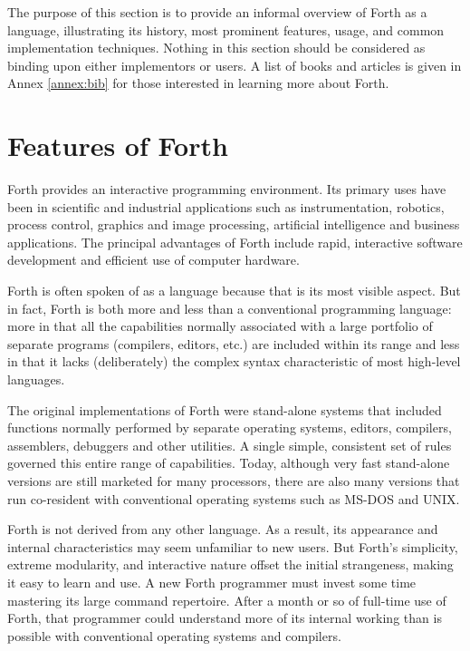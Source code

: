 \label{annex:intro}

The purpose of this section is to provide an informal overview of
Forth as a language, illustrating its history, most prominent
features, usage, and common implementation techniques. Nothing in
this section should be considered as binding upon either implementors
or users. A list of books and articles is given in Annex
\ref{annex:bib} for those interested in learning more about Forth.

\section{Features of Forth} %

Forth provides an interactive programming environment. Its primary
uses have been in scientific and industrial applications such as
instrumentation, robotics, process control, graphics and image
processing, artificial intelligence and business applications. The
principal advantages of Forth include rapid, interactive software
development and efficient use of computer hardware.

Forth is often spoken of as a language because that is its most
visible aspect. But in fact, Forth is both more and less than a
conventional programming language: more in that all the capabilities
normally associated with a large portfolio of separate programs
(compilers, editors, etc.) are included within its range and less in
that it lacks (deliberately) the complex syntax characteristic of
most high-level languages.

The original implementations of Forth were stand-alone systems that
included functions normally performed by separate operating systems,
editors, compilers, assemblers, debuggers and other utilities. A
single simple, consistent set of rules governed this entire range of
capabilities. Today, although very fast stand-alone versions are
still marketed for many processors, there are also many versions that
run co-resident with conventional operating systems such as MS-DOS
and UNIX.

Forth is not derived from any other language. As a result, its
appearance and internal characteristics may seem unfamiliar to new
users. But Forth's simplicity, extreme modularity, and interactive
nature offset the initial strangeness, making it easy to learn and
use. A new Forth programmer must invest some time mastering its large
command repertoire. After a month or so of full-time use of Forth,
that programmer could understand more of its internal working than is
possible with conventional operating systems and compilers.

